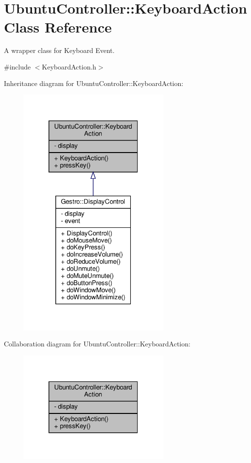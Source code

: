 \hypertarget{class_ubuntu_controller_1_1_keyboard_action}{}\section{Ubuntu\+Controller\+:\+:Keyboard\+Action Class Reference}
\label{class_ubuntu_controller_1_1_keyboard_action}


A wrapper class for Keyboard Event.  




{\ttfamily \#include $<$Keyboard\+Action.\+h$>$}



Inheritance diagram for Ubuntu\+Controller\+:\+:Keyboard\+Action\+:
\nopagebreak
\begin{figure}[H]
\begin{center}
\leavevmode
\includegraphics[width=217pt]{class_ubuntu_controller_1_1_keyboard_action__inherit__graph}
\end{center}
\end{figure}


Collaboration diagram for Ubuntu\+Controller\+:\+:Keyboard\+Action\+:
\nopagebreak
\begin{figure}[H]
\begin{center}
\leavevmode
\includegraphics[width=217pt]{class_ubuntu_controller_1_1_keyboard_action__coll__graph}
\end{center}
\end{figure}
